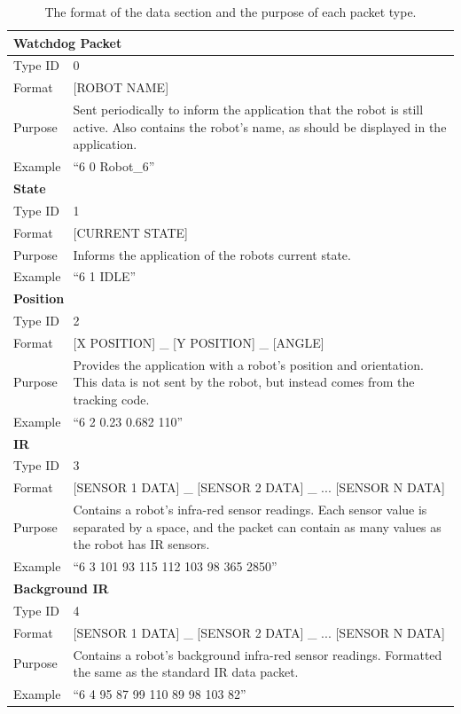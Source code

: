 \begin{longtable}{ l p{12cm} }
\caption[Data Format]{The format of the data section and the purpose of each packet type.}\\
 \hline
 \multicolumn{2}{p{12cm}}{\textbf{Watchdog Packet}}\\
 \hline
 Type ID & 0 \\
 Format & [ROBOT NAME]\\
 Purpose & Sent periodically to inform the application that the robot is still active. Also contains the robot's name, as should be displayed in the application.\\
 Example & ``6 0 Robot_6''\\
 
 \hline
 \multicolumn{2}{p{12cm}}{\textbf{State}}\\
 \hline
 Type ID & 1 \\
 Format & [CURRENT STATE]\\
 Purpose & Informs the application of the robots current state.\\
 Example & ``6 1 IDLE''\\
 
 \hline
 \multicolumn{2}{p{12cm}}{\textbf{Position}}\\
 \hline
 Type ID & 2 \\
 Format & [X POSITION] \_ [Y POSITION] \_ [ANGLE]\\
 Purpose & Provides the application with a robot's position and orientation. This data is not sent by the robot, but instead comes from the tracking code.\\
 Example & ``6 2 0.23 0.682 110''\\
 
 \hline
 \multicolumn{2}{p{12cm}}{\textbf{IR}}\\
 \hline
 Type ID & 3 \\
 Format & [SENSOR 1 DATA] \_ [SENSOR 2 DATA] \_ ... [SENSOR N DATA] \\
 Purpose & Contains a robot's infra-red sensor readings. Each sensor value is separated by a space, and the packet can contain as many values as the robot has IR sensors. \\
 Example & ``6 3 101 93 115 112 103 98 365 2850''\\
 
 \hline
 \multicolumn{2}{p{12cm}}{\textbf{Background IR}}\\
 \hline
 Type ID & 4 \\
 Format & [SENSOR 1 DATA] \_ [SENSOR 2 DATA] \_ ... [SENSOR N DATA] \\
 Purpose & Contains a robot's background infra-red sensor readings. Formatted the same as the standard IR data packet.\\
 Example & ``6 4 95 87 99 110 89 98 103 82''\\
 

\end{longtable}
